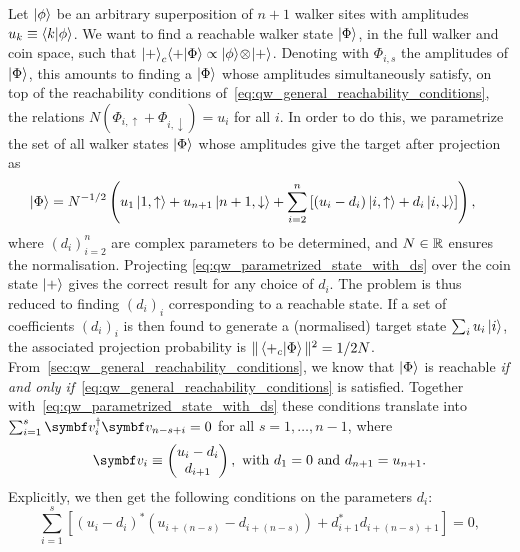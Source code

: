 Let $\ket\phi$ be an arbitrary superposition of $n+1$ walker sites with amplitudes $u_k \equiv \braket{k}{\phi}$.
We want to find a reachable walker state $\ket\Phi$, in the full walker and coin space, such that
$\ket{+}_c \!\braket{+}{\Phi} \propto \ket\phi \!\otimes\! \ket+$.
Denoting with $\Phi_{i,s}$ the amplitudes of $\ket\Phi$, this amounts to finding a $\ket\Phi$ whose amplitudes simultaneously satisfy, on top of the reachability conditions of~\cref{eq:qw_general_reachability_conditions}, the relations
${N(\Phi_{i,\uparrow}+\Phi_{i,\downarrow})= u_i}$ for all $i$.
In order to do this, we parametrize the set of all walker states $\ket\Phi$ whose amplitudes give the target after projection as
\begin{equation}
\begin{aligned}
    \ket\Phi &= N^{-1/2} \left( u_1 \ket{1,\uparrow} + u_{n+1} \ket{n+1,\downarrow}
	+ \sum_{i=2}^n \left[
		(u_i - d_i) \ket{i, \uparrow} +
		d_i \ket{i, \downarrow}
	\right] \right),
\end{aligned}
\label{eq:qw_parametrized_state_with_ds}
\end{equation}
where $(d_i)_{i=2}^n$ are complex parameters to be determined, and $N\in\mathbb{R}$ ensures the normalisation.
Projecting \cref{eq:qw_parametrized_state_with_ds} over the coin state $\ket+$ gives the correct result for any choice of $d_i$.
The problem is thus reduced to finding $(d_i)_i$ corresponding to a reachable state.
If a set of coefficients $(d_i)_i$ is then found to generate a (normalised) target state $\sum_i u_i \ket i$, the associated projection probability is
$\|\braket{+_c}{\Phi}\|^2=1/2N$.
From~\cref{sec:qw_general_reachability_conditions}, we know that $\ket\Phi$ is reachable \textit{if and only if}~\cref{eq:qw_general_reachability_conditions} is satisfied. Together with~\cref{eq:qw_parametrized_state_with_ds} these conditions translate into $\sum_{i=1}^{s} \bs v_i^\dagger \bs v_{n-s+i}=0$ for all $s=1,\dots,n-1$, where
\begin{equation}
    \bs v_i \equiv \begin{pmatrix}
        u_i - d_i \\ d_{i+1}
    \end{pmatrix},
    \text{ with } d_1 = 0 \text{ and } d_{n+1}=u_{n+1}.
\end{equation}
Explicitly, we then get the following conditions on the parameters $d_i$:
\begin{equation}
	\sum_{i=1}^s \left[
	  (u_i - d_i)^*
      (u_{i+(n-s)} - d_{i+(n-s)})
	  +
      d_{i+1}^* d_{i+(n-s)+1}
    \right]
	= 0,
	\label{eq:qw_conditions_for_ds}
\end{equation}
